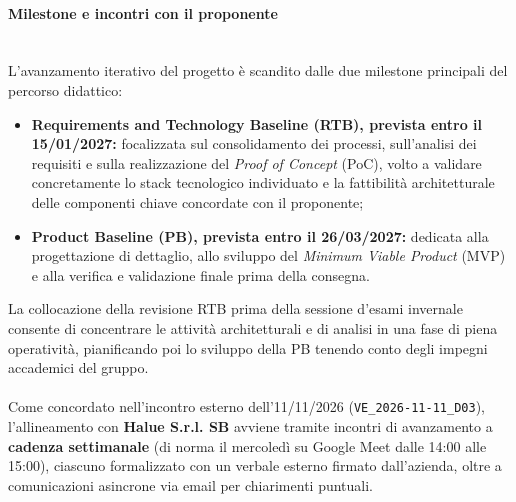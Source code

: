 \paragraph{Milestone e incontri con il proponente}~\\[0.15cm]
L'avanzamento iterativo del progetto è scandito dalle due milestone principali del percorso didattico:
\begin{itemize}
    \item \textbf{Requirements and Technology Baseline (RTB), prevista entro il 15/01/2027:} focalizzata sul consolidamento dei processi, sull'analisi dei requisiti e sulla realizzazione del \textit{Proof of Concept} (PoC), volto a validare concretamente lo stack tecnologico individuato e la fattibilità architetturale delle componenti chiave concordate con il proponente;
    \item \textbf{Product Baseline (PB), prevista entro il 26/03/2027:} dedicata alla progettazione di dettaglio, allo sviluppo del \textit{Minimum Viable Product} (MVP) e alla verifica e validazione finale prima della consegna.
\end{itemize}
La collocazione della revisione RTB prima della sessione d'esami invernale consente di concentrare le attività architetturali e di analisi in una fase di piena operatività, pianificando poi lo sviluppo della PB tenendo conto degli impegni accademici del gruppo. \\
\\
Come concordato nell'incontro esterno dell'11/11/2026 (\texttt{VE\_2026-11-11\_D03}), l'allineamento con \textbf{Halue S.r.l. SB} avviene tramite incontri di avanzamento a \textbf{cadenza settimanale} (di norma il mercoledì su Google Meet dalle 14:00 alle 15:00), ciascuno formalizzato con un verbale esterno firmato dall'azienda, oltre a comunicazioni asincrone via email per chiarimenti puntuali.